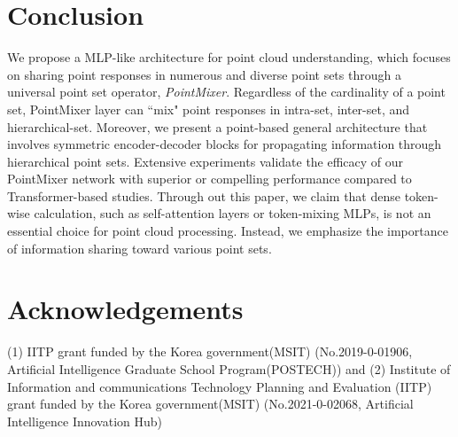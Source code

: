










































%
 
\section{Conclusion}
\label{sec:Conclusion}
We propose a MLP-like architecture for point cloud understanding, which focuses on sharing point responses in numerous and diverse point sets through a universal point set operator, \emph{PointMixer}.
Regardless of the cardinality of a point set, PointMixer layer can ``mix" point responses in intra-set, inter-set, and hierarchical-set. Moreover, we present a point-based general architecture that involves symmetric encoder-decoder blocks for propagating information through hierarchical point sets. 
Extensive experiments validate the efficacy of our PointMixer network with superior or compelling performance compared to Transformer-based studies. 
Through out this paper, we claim that dense token-wise calculation, such as self-attention layers or token-mixing MLPs, is not an essential choice for point cloud processing. Instead, we emphasize the importance of information sharing toward various point sets. 
\section*{Acknowledgements}
(1) IITP grant funded by the Korea government(MSIT) (No.2019-0-01906, Artificial Intelligence Graduate School Program(POSTECH)) and (2) Institute of Information and communications Technology Planning and Evaluation (IITP) grant funded by the Korea government(MSIT) (No.2021-0-02068, Artificial Intelligence Innovation Hub)




